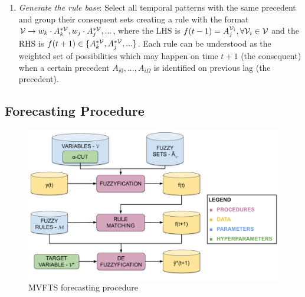 \begin{enumerate}
\begin{enumerate}
\item \textit{Generate the rule base}: Select all temporal patterns with the same precedent and group their consequent sets  creating a rule with the format $\mathcal{V} \rightarrow w_k \cdot A_k^{*\mathcal{V}}, w_j \cdot A_j^{*\mathcal{V}},...$, where the LHS is $f(t - 1) = A_j^{\mathcal{V}_i}, \forall \mathcal{V}_i \in \mathcal{V}$ and the RHS is $f(t+1) \in \{A_k^{*\mathcal{V}},A_j^{*\mathcal{V}},... \}$. Each rule can be understood as the weighted set of possibilities which may happen on time $t+1$ (the consequent) when a certain precedent $A_{i0},...,A_{i\Omega}$ is identified on previous lag (the precedent).
\end{enumerate}
\end{enumerate}


\subsection{Forecasting Procedure} 
\label{sec:mvfts_forecasting_procedure}

\begin{figure}
\centering
\includegraphics[width=\textwidth]{figures/mvfts_forecasting_procedure.pdf}
\caption{MVFTS forecasting procedure} \label{fig:mvfts_forecasting_procedure}
\end{figure}

